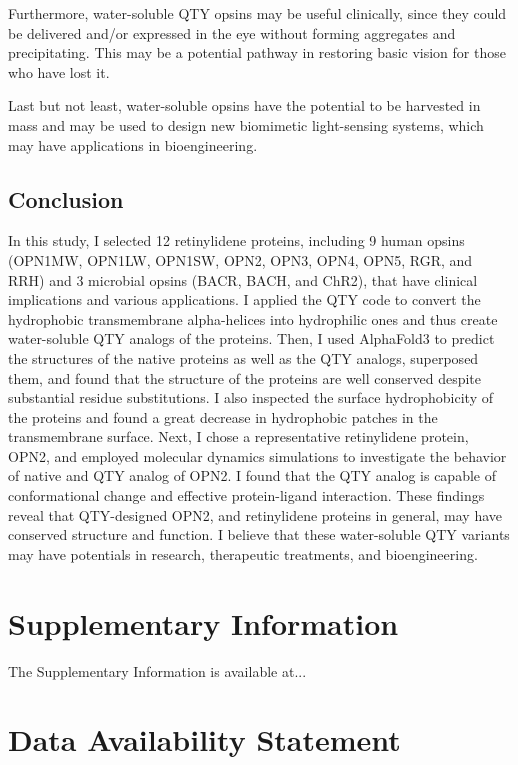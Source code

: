 \documentclass[fleqn, 10pt]{manuscript}
\begin{document}
Furthermore, water-soluble QTY opsins may be useful clinically, since they could be delivered and/or expressed in the eye without forming aggregates and precipitating. This may be a potential pathway in restoring basic vision for those who have lost it. 

Last but not least, water-soluble opsins have the potential to be harvested in mass and may be used to design new biomimetic light-sensing systems, which may have applications in bioengineering. 

\subsection*{Conclusion}

In this study, I selected 12 retinylidene proteins, including 9 human opsins (OPN1MW, OPN1LW, OPN1SW, OPN2, OPN3, OPN4, OPN5, RGR, and RRH) and 3 microbial opsins (BACR, BACH, and ChR2), that have clinical implications and various applications. I applied the QTY code to convert the hydrophobic transmembrane alpha-helices into hydrophilic ones and thus create water-soluble QTY analogs of the proteins. Then, I used AlphaFold3 to predict the structures of the native proteins as well as the QTY analogs, superposed them, and found that the structure of the proteins are well conserved despite substantial residue substitutions. I also inspected the surface hydrophobicity of the proteins and found a great decrease in hydrophobic patches in the transmembrane surface. Next, I chose a representative retinylidene protein, OPN2, and employed molecular dynamics simulations to investigate the behavior of native and QTY analog of OPN2. I found that the QTY analog is capable of conformational change and effective protein-ligand interaction. These findings reveal that QTY-designed OPN2, and retinylidene proteins in general, may have conserved structure and function. I believe that these water-soluble QTY variants may have potentials in research, therapeutic treatments, and bioengineering. 


\section*{Supplementary Information} 

The Supplementary Information is available at...

\section*{Data Availability Statement} 
\end{document}
